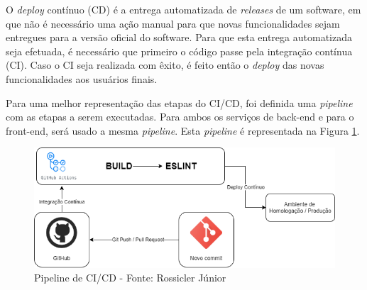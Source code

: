 {O \textit{deploy} contínuo (CD) é a entrega automatizada de \textit{releases} de um software, em que não é necessário uma ação manual para que novas funcionalidades sejam entregues para a versão oficial do software. Para que esta entrega automatizada seja efetuada, é necessário que primeiro o código passe pela integração contínua (CI). Caso o CI seja realizada com êxito, é feito então o \textit{deploy} das novas funcionalidades aos usuários finais.

Para uma melhor representação das etapas do CI/CD, foi definida uma \textit{pipeline} com as etapas a serem executadas. Para ambos os serviços de back-end e para o front-end, será usado a mesma \textit{pipeline}. Esta \textit{pipeline} é representada na Figura \ref{Fig:pipeline_ci_cd.png}.

\begin{figure}[htbp]
	\centering
		\includegraphics[keepaspectratio=true,scale=0.60]{figuras/gces/integracao_continua.png}
	\caption{{\color{textadded}Pipeline de CI/CD - Fonte: Rossicler Júnior}}
	\label{Fig:pipeline_ci_cd.png}
\end{figure}

}


